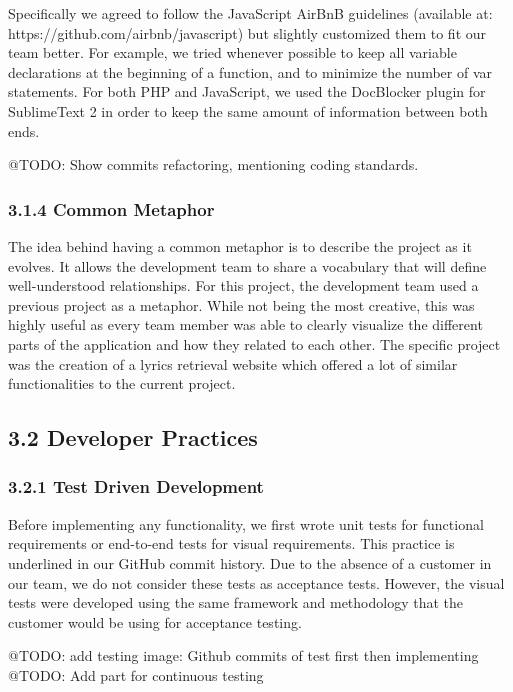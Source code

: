 \documentclass[]{article}
\begin{document}
Specifically we agreed to follow the JavaScript AirBnB guidelines
(available at: https://github.com/airbnb/javascript) but slightly
customized them to fit our team better. For example, we tried whenever
possible to keep all variable declarations at the beginning of a
function, and to minimize the number of var statements. For both PHP and
JavaScript, we used the DocBlocker plugin for SublimeText 2 in order to
keep the same amount of information between both ends.

@TODO: Show commits refactoring, mentioning coding standards.

\subsubsection{3.1.4 Common Metaphor}\label{common-metaphor}

The idea behind having a common metaphor is to describe the project as
it evolves. It allows the development team to share a vocabulary that
will define well-understood relationships. For this project, the
development team used a previous project as a metaphor. While not being
the most creative, this was highly useful as every team member was able
to clearly visualize the different parts of the application and how they
related to each other. The specific project was the creation of a lyrics
retrieval website which offered a lot of similar functionalities to the
current project.

\subsection{3.2 Developer Practices}\label{developer-practices}

\subsubsection{3.2.1 Test Driven
Development}\label{test-driven-development}

Before implementing any functionality, we first wrote unit tests for
functional requirements or end-to-end tests for visual requirements.
This practice is underlined in our GitHub commit history. Due to the
absence of a customer in our team, we do not consider these tests as
acceptance tests. However, the visual tests were developed using the
same framework and methodology that the customer would be using for
acceptance testing.

@TODO: add testing image: Github commits of test first then implementing
@TODO: Add part for continuous testing
\end{document}
